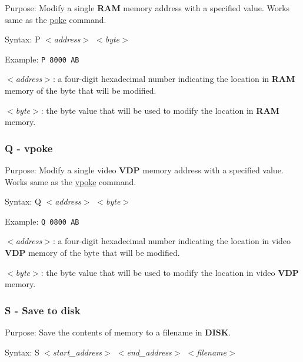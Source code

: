         Purpose: Modify a single \textbf{RAM} memory address with a specified
        value. Works same as the \hyperref[cmd:poke]{poke} command.

        Syntax: P \textit{$<$address$>$ $<$byte$>$}

        Example: \texttt{P 8000 AB}

        \hspace{1cm}\textit{$<$address$>$}: a four-digit hexadecimal number
        indicating the location in \textbf{RAM} memory of the byte that will be
        modified.

        \hspace{1cm}\textit{$<$byte$>$}: the byte value that will be used to
        modify the location in \textbf{RAM} memory.

        \subsubsection{Q - vpoke}

        Purpose: Modify a single video \textbf{VDP} memory address with a
        specified value. Works same as the \hyperref[cmd:vpoke]{vpoke} command.

        Syntax: Q \textit{$<$address$>$ $<$byte$>$}

        Example: \texttt{Q 0800 AB}

        \hspace{1cm}\textit{$<$address$>$}: a four-digit hexadecimal number
        indicating the location in video \textbf{VDP} memory of the byte that
        will be modified.

        \hspace{1cm}\textit{$<$byte$>$}: the byte value that will be used to
        modify the location in video \textbf{VDP} memory.

        \subsubsection{S - Save to disk}

        Purpose: Save the contents of memory to a filename in \textbf{DISK}.

        Syntax: S \textit{$<$start\_address$>$ $<$end\_address$>$ $<$filename$>$}

